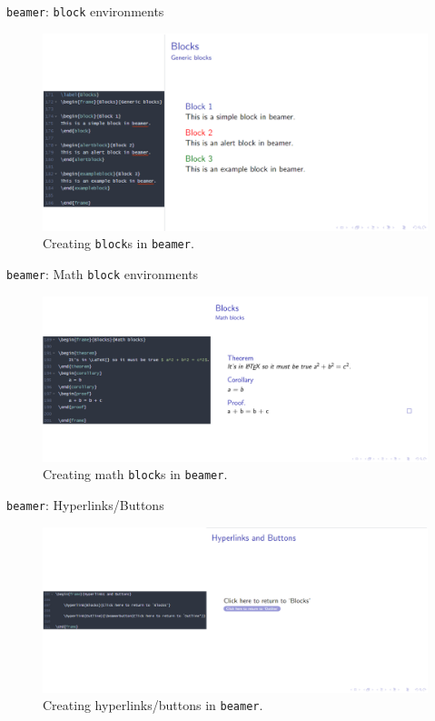 \documentclass{beamer}
\begin{document}
{  \begin{frame}{\texttt{beamer}: \texttt{block} environments}
    \begin{figure}
      \includegraphics[width=\linewidth]{day03-06H-beamerblocks.png}
      \caption{Creating \texttt{block}s in \texttt{beamer}.}
      \label{fig:day03-06H-beamerblocks}
    \end{figure}
  \end{frame}

  \begin{frame}{\texttt{beamer}: Math \texttt{block} environments}
    \begin{figure}
      \includegraphics[width=\linewidth]{day03-06I-beamermathblocks.png}
      \caption{Creating math \texttt{block}s in \texttt{beamer}.}
      \label{fig:day03-06I-beamermathblocks}
    \end{figure}
  \end{frame}

  \begin{frame}{\texttt{beamer}: Hyperlinks/Buttons}
    \begin{figure}
      \includegraphics[width=\linewidth]{day03-06J-beamerlinks.png}
      \caption{Creating hyperlinks/buttons in \texttt{beamer}.}
      \label{fig:day03-06J-beamerlinks}
    \end{figure}
  \end{frame}

}
\end{document}

